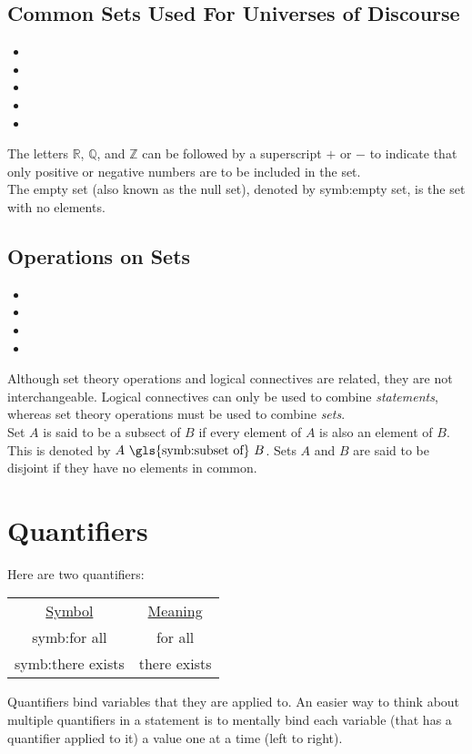 \documentclass{article}
\begin{document}
\subsection{Common Sets Used For Universes of Discourse}
\begin{itemize}
    \item {}
    \item {}
    \item {}
    \item {}
    \item {}
\end{itemize}
The letters $\mathbb{R}$, $\mathbb{Q}$, and $\mathbb{Z}$ can be followed by a superscript $+$ or $-$ to indicate that only positive or negative numbers are to be included in the set.\\

\noindent The empty set (also known as the null set), denoted by \gls{symb:empty set}, is the set with no elements. 

\subsection{Operations on Sets}
\begin{itemize}
    \item {}
    \item {}
    \item {}
    \item {}
\end{itemize}
Although set theory operations and logical connectives are related, they are not interchangeable. Logical connectives can only be used to combine \textit{statements}, whereas set theory operations must be used to combine \textit{sets}.\\

\noindent Set $A$ is said to be a subsect of $B$ if every element of $A$ is also an element of $B$. This is denoted by $A \text{ \gls{symb:subset of} } B$. Sets $A$ and $B$ are said to be \gls{disjoint} if they have no elements in common.

\section{Quantifiers}
Here are two quantifiers:
\begin{center}
\begin{tabular}{@{}cc@{}}
	\underline{Symbol} & \underline{Meaning} \\
	\gls{symb:for all} & for all \\
	\gls{symb:there exists} & there exists\\
\end{tabular}
\end{center}
Quantifiers bind variables that they are applied to. An easier way to think about multiple quantifiers in a statement is to mentally bind each variable (that has a quantifier applied to it) a value one at a time (left to right).

\clearpage
\printglossary[type=\acronymtype,style=long]  %
\printglossary[type=symbolslist,style=long]   %
\printglossary[type=main]                     %
\end{document}
